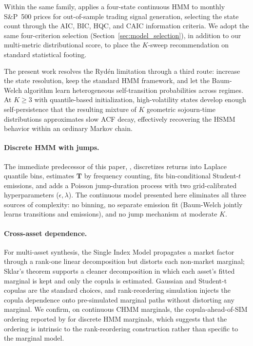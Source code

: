 Within the same family, \citet{nguyen2018hidden} applies a four-state continuous HMM to monthly S\&P~500 prices for out-of-sample trading signal generation, selecting the state count through the AIC, BIC, HQC, and CAIC information criteria.
We adopt the same four-criterion selection (Section~\ref{sec:model_selection}), in addition to our multi-metric distributional score, to place the $K$-sweep recommendation on standard statistical footing.

The present work resolves the Ryd\'{e}n limitation through a third route: increase the state resolution, keep the standard HMM framework, and let the Baum-Welch algorithm learn heterogeneous self-transition probabilities across regimes.
At $K \geq 3$ with quantile-based initialization, high-volatility states develop enough self-persistence that the resulting mixture of $K$ geometric sojourn-time distributions approximates slow ACF decay, effectively recovering the HSMM behavior within an ordinary Markov chain.

\paragraph{Discrete HMM with jumps.}
The immediate predecessor of this paper, \citet{alswaidan2026hybrid}, discretizes returns into Laplace quantile bins, estimates $\mathbf{T}$ by frequency counting, fits bin-conditional Student-$t$ emissions, and adds a Poisson jump-duration process with two grid-calibrated hyperparameters ($\epsilon, \lambda$).
The continuous model presented here eliminates all three sources of complexity: no binning, no separate emission fit (Baum-Welch jointly learns transitions and emissions), and no jump mechanism at moderate $K$.

\paragraph{Cross-asset dependence.}
For multi-asset synthesis, the Single Index Model \cite{sharpe1963simplified} propagates a market factor through a rank-one linear decomposition but distorts each non-market marginal; Sklar's theorem \cite{sklar1959fonctions, nelsen2006introduction} supports a cleaner decomposition in which each asset's fitted marginal is kept and only the copula is estimated.
Gaussian and Student-t copulas \cite{demarta2005tcopula, mcneil2015quantitative} are the standard choices, and rank-reordering simulation \cite{iman1982distribution} injects the copula dependence onto pre-simulated marginal paths without distorting any marginal.
We confirm, on continuous CHMM marginals, the copula-ahead-of-SIM ordering reported by \citet{alswaidan2026hybrid} for discrete HMM marginals, which suggests that the ordering is intrinsic to the rank-reordering construction rather than specific to the marginal model.

